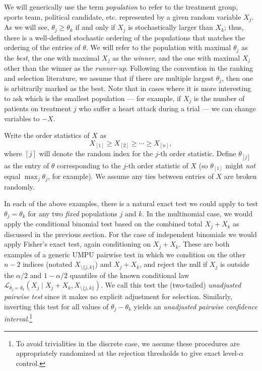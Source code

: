\documentclass[11pt]{article}
\begin{document}
We will generically use the term {\em population} to refer to the treatment group, sports team, political candidate, etc. represented by a given random variable $X_j$. As we will see, $\theta_j \ge \theta_k$ if and only if $X_j$ is stochastically larger than $X_k$; thus, there is a well-defined stochastic ordering of the populations that matches the ordering of the entries of $\theta$. We will refer to the population with maximal $\theta_j$ as the {\em best}, the one with maximal $X_j$ as the {\em winner}, and the one with maximal $X_j$ other than the winner as the {\em runner-up}. Following the convention in the ranking and selection literature, we assume that if there are multiple largest $\theta_j$, then one is arbitrarily marked as the best. Note that in cases where it is more interesting to ask which is the smallest population --- for example, if $X_j$ is the number of patients on treatment $j$ who suffer a heart attack during a trial --- we can change variables to $-X$. 

Write the order statistics of $X$ as
$$X_{[1]} \ge X_{[2]} \ge \cdots \ge X_{[n]},$$
where $[j]$ will denote the random index for the $j$-th order statistic. Define $\theta_{[j]}$ as the entry of $\theta$ corresponding to the $j$-th order statistic of $X$ (so $\theta_{[1]}$ might {\em not} equal $\max_j \theta_j$, for example). We assume any ties between entries of $X$ are broken randomly.

In each of the above examples, there is a natural exact test we could apply to test $\theta_j=\theta_k$ for any two {\em fixed} populations $j$ and $k$. In the multinomial case, we would apply the conditional binomial test based on the combined total $X_j+X_k$ as discussed in the previous section. For the case of independent binomials we would apply Fisher's exact test, again conditioning on $X_j+X_k$. These are both examples of a generic UMPU pairwise test in which we condition on the other $n-2$ indices (notated $X_{\setminus \{j,k\}}$) and $X_j+X_k$, and reject the null if $X_j$ is outside the $\alpha/2$ and $1-\alpha/2$ quantiles of the known conditional law $\mathcal{L}_{\theta_j=\theta_k}(X_j \mid X_j+X_k, X_{\setminus\{j,k\}})$. We call this test the (two-tailed) {\em unadjusted pairwise test} since it makes no explicit adjustment for selection. Similarly, inverting this test for all values of $\theta_j-\theta_k$ yields an {\em unadjusted pairwise confidence interval}.\footnote{To avoid trivialities in the discrete case, we assume these procedures are appropriately randomized at the rejection thresholds to give exact level-$\alpha$ control.}
\end{document}
